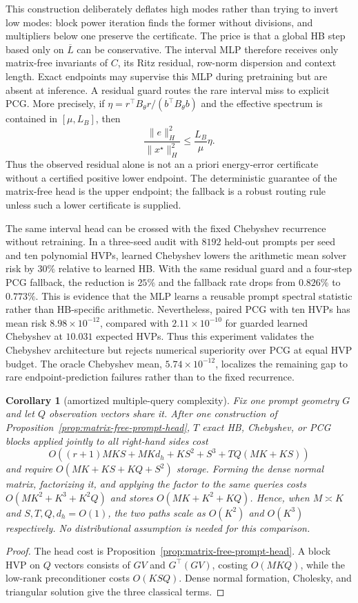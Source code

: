\documentclass[11pt]{article}
\newtheorem{corollary}{Corollary}
\begin{document}
This construction deliberately deflates high modes rather than trying to
invert low modes: block power iteration finds the former without divisions,
and multipliers below one preserve the certificate.  The price is that a
global HB step based only on $\overline L$ can be conservative.  The interval
MLP therefore receives only matrix-free invariants of $C$, its Ritz residual,
row-norm dispersion and context length.  Exact endpoints may supervise this
MLP during pretraining but are absent at inference.  A residual guard routes
the rare interval miss to explicit PCG.  More precisely, if
$\eta=r^\top B_\theta r/(b^\top B_\theta b)$ and the effective spectrum is
contained in $[\mu,L_B]$, then
\[
 \frac{\lVert e\rVert_H^2}{\lVert x^\star\rVert_H^2}
 \leq \frac{L_B}{\mu}\eta.
\]
Thus the observed residual alone is not an a priori energy-error certificate
without a certified positive lower endpoint.  The deterministic guarantee of
the matrix-free head is the upper endpoint; the fallback is a robust routing
rule unless such a lower certificate is supplied.

The same interval head can be crossed with the fixed Chebyshev recurrence
without retraining.  In a three-seed audit with $8192$ held-out prompts per
seed and ten polynomial HVPs, learned Chebyshev lowers the arithmetic mean
solver risk by $30\%$ relative to learned HB.  With the same residual guard
and a four-step PCG fallback, the reduction is $25\%$ and the fallback rate
drops from $0.826\%$ to $0.773\%$.  This is evidence that the MLP learns a
reusable prompt spectral statistic rather than HB-specific arithmetic.
Nevertheless, paired PCG with ten HVPs has mean risk
$8.98\times10^{-12}$, compared with $2.11\times10^{-10}$ for guarded learned
Chebyshev at $10.031$ expected HVPs.  Thus this experiment validates the
Chebyshev architecture but rejects numerical superiority over PCG at equal
HVP budget.  The oracle Chebyshev mean, $5.74\times10^{-12}$, localizes the
remaining gap to rare endpoint-prediction failures rather than to the fixed
recurrence.

\begin{corollary}[amortized multiple-query complexity]
\label{cor:matrix-free-multiple-rhs}
Fix one prompt geometry $G$ and let $Q$ observation vectors share it.  After
one construction of Proposition~\ref{prop:matrix-free-prompt-head}, $T$ exact
HB, Chebyshev, or PCG blocks applied jointly to all right-hand sides cost
\[
 O\!\left((r+1)MKS+MKd_h+KS^2+S^3
          +TQ(MK+KS)\right)
\]
and require $O(MK+KS+KQ+S^2)$ storage.  Forming the dense normal matrix,
factorizing it, and applying the factor to the same queries costs
$O(MK^2+K^3+K^2Q)$ and stores $O(MK+K^2+KQ)$.  Hence, when $M\asymp K$ and
$S,T,Q,d_h=O(1)$, the two paths scale as $O(K^2)$ and $O(K^3)$ respectively.
No distributional assumption is needed for this comparison.
\end{corollary}
\begin{proof}
The head cost is Proposition~\ref{prop:matrix-free-prompt-head}.  A block HVP
on $Q$ vectors consists of $GV$ and $G^\top(GV)$, costing $O(MKQ)$, while the
low-rank preconditioner costs $O(KSQ)$.  Dense normal formation, Cholesky,
and triangular solution give the three classical terms.
\end{proof}
\end{document}

